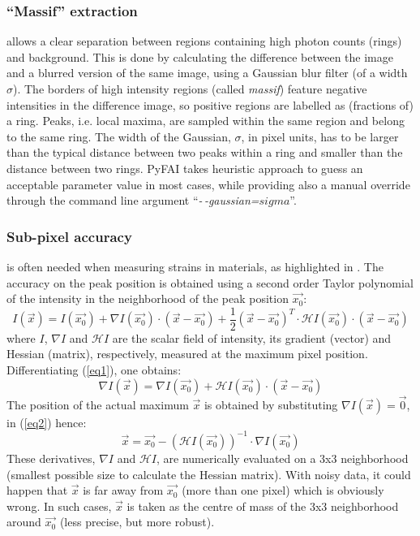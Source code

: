 \documentclass{iucr}
\begin{document}
\subsubsection{``Massif'' extraction}
\label{massif}
allows a clear separation between regions containing high
photon counts (rings) and background.
This is done by calculating the difference between the image and a blurred version
of the same image, using a Gaussian blur filter (of a width $\sigma$).
The borders of high intensity regions (called \textit{massif}) feature
negative intensities in the difference image, so positive regions are labelled
as (fractions of) a ring.
Peaks, i.e. local maxima,
are sampled within the same region and belong to the same ring.
The width of the Gaussian, $\sigma$, in pixel units, has to be larger than the
typical distance between two peaks within a ring and smaller than the distance between two
rings.
PyFAI takes heuristic approach to guess an acceptable parameter value in
most cases, while providing also a manual override through the command line
argument ``\textit{-\,-gaussian=$sigma$}''.

\subsubsection{Sub-pixel accuracy}
\label{subpixel}
is often needed when measuring strains in materials, as highlighted in
\cite{to5079}.
The accuracy on the peak position is obtained using a second order Taylor
polynomial of the intensity in the neighborhood of the peak
position $\overrightarrow{x_0}$:
\begin{equation}
\label{eq1}
I(\overrightarrow{x}) = I(\overrightarrow{x_0}) + \nabla
I(\overrightarrow{x_0})\cdot (\overrightarrow{x}-\overrightarrow{x_0}) +
\frac{1}{2} (\overrightarrow{x}-\overrightarrow{x_0})^T\cdot\mathcal{H}
I(\overrightarrow{x_0})\cdot(\overrightarrow{x}-\overrightarrow{x_0})
\end{equation}
where $I$,
$\nabla I$ and $\mathcal{H} I$ are the scalar field of intensity, its gradient
(vector) and Hessian (matrix), respectively, measured at the maximum pixel position.
Differentiating (\ref{eq1}), one obtains:
\begin{equation}
\label{eq2}
\nabla I(\overrightarrow{x}) =\nabla I(\overrightarrow{x_0}) +
\mathcal{H}I(\overrightarrow{x_0})\cdot(\overrightarrow{x}-\overrightarrow{x_0})
\end{equation}
The position of the actual maximum $\overrightarrow{x}$ is obtained by substituting
$\nabla I(\overrightarrow{x})=\overrightarrow{0}$, in (\ref{eq2}) hence:
\begin{equation}
\label{eq3}
\overrightarrow{x} = \overrightarrow{x_0} - (\mathcal{H}
I(\overrightarrow{x_0}))^{-1}\cdot\nabla I(\overrightarrow{x_0})
 \end{equation}
These derivatives, $\nabla I$ and $\mathcal{H} I$, are numerically evaluated
on a 3x3 neighborhood (smallest possible size to calculate the Hessian matrix).
With noisy data, it could happen that
$\overrightarrow{x}$ is far away from $\overrightarrow{x_0}$ (more than one
pixel) which is obviously wrong.
In such cases, $\overrightarrow{x}$ is taken as the centre of mass of the 3x3
neighborhood around $\overrightarrow{x_0}$ (less precise, but more robust).
\end{document}
